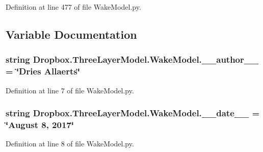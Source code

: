 Definition at line 477 of file Wake\+Model.\+py.



\subsection{Variable Documentation}
\hypertarget{namespaceDropbox_1_1ThreeLayerModel_1_1WakeModel_a2fbb02bcdb29d44d2a6813bd3e4ab4c4}{
\subsubsection[{\+\_\+\+\_\+author\+\_\+\+\_\+}]{\setlength{\rightskip}{0pt plus 5cm}string Dropbox.\+Three\+Layer\+Model.\+Wake\+Model.\+\_\+\+\_\+author\+\_\+\+\_\+ = \char`\"{}Dries Allaerts\char`\"{}}}\label{namespaceDropbox_1_1ThreeLayerModel_1_1WakeModel_a2fbb02bcdb29d44d2a6813bd3e4ab4c4}


Definition at line 7 of file Wake\+Model.\+py.

\hypertarget{namespaceDropbox_1_1ThreeLayerModel_1_1WakeModel_a10eae33c81fdae90e5f34b50b894649c}{
\subsubsection[{\+\_\+\+\_\+date\+\_\+\+\_\+}]{\setlength{\rightskip}{0pt plus 5cm}string Dropbox.\+Three\+Layer\+Model.\+Wake\+Model.\+\_\+\+\_\+date\+\_\+\+\_\+ = \char`\"{}August 8, 2017\char`\"{}}}\label{namespaceDropbox_1_1ThreeLayerModel_1_1WakeModel_a10eae33c81fdae90e5f34b50b894649c}


Definition at line 8 of file Wake\+Model.\+py.


